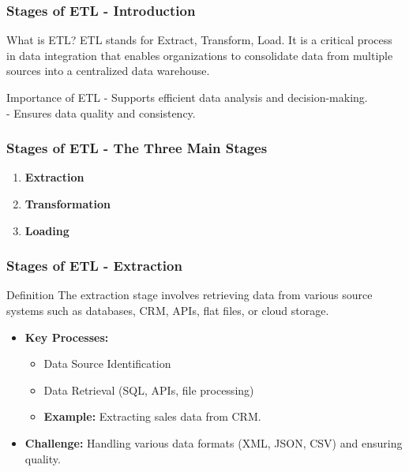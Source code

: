 \documentclass[aspectratio=169]{beamer}
\begin{document}
\begin{frame}[fragile]
    \frametitle{Stages of ETL - Introduction}
    \begin{block}{What is ETL?}
        ETL stands for Extract, Transform, Load. It is a critical process in data integration that enables organizations to consolidate data from multiple sources into a centralized data warehouse.
    \end{block}
    \begin{block}{Importance of ETL}
        - Supports efficient data analysis and decision-making.\\
        - Ensures data quality and consistency.
    \end{block}
\end{frame}

\begin{frame}[fragile]
    \frametitle{Stages of ETL - The Three Main Stages}
    \begin{enumerate}
        \item \textbf{Extraction}
        \item \textbf{Transformation}
        \item \textbf{Loading}
    \end{enumerate}
\end{frame}

\begin{frame}[fragile]
    \frametitle{Stages of ETL - Extraction}
    \begin{block}{Definition}
        The extraction stage involves retrieving data from various source systems such as databases, CRM, APIs, flat files, or cloud storage.
    \end{block}
    \begin{itemize}
        \item \textbf{Key Processes:}
        \begin{itemize}
            \item Data Source Identification
            \item Data Retrieval (SQL, APIs, file processing)
            \item \textbf{Example:} Extracting sales data from CRM.
        \end{itemize}
        \item \textbf{Challenge:} Handling various data formats (XML, JSON, CSV) and ensuring quality.
    \end{itemize}
\end{frame}
\end{document}
